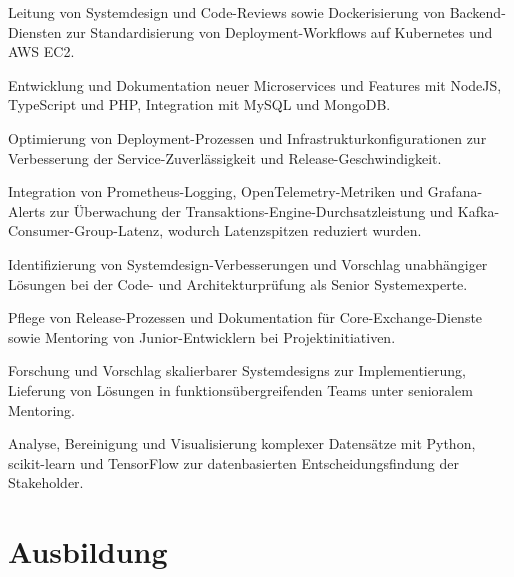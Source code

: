 \documentclass[10pt,a4paper]{resume}
\begin{document}
\bullets
  \item Leitung von Systemdesign und Code-Reviews sowie Dockerisierung von Backend-Diensten zur Standardisierung von Deployment-Workflows auf Kubernetes und AWS EC2.
  \item Entwicklung und Dokumentation neuer Microservices und Features mit NodeJS, TypeScript und PHP, Integration mit MySQL und MongoDB.
  \item Optimierung von Deployment-Prozessen und Infrastrukturkonfigurationen zur Verbesserung der Service-Zuverlässigkeit und Release-Geschwindigkeit.
\bulletsend
\vspace{1.5pt}
\bullets
  \item Integration von Prometheus-Logging, OpenTelemetry-Metriken und Grafana-Alerts zur Überwachung der Transaktions-Engine-Durchsatzleistung und Kafka-Consumer-Group-Latenz, wodurch Latenzspitzen reduziert wurden.
  \item Identifizierung von Systemdesign-Verbesserungen und Vorschlag unabhängiger Lösungen bei der Code- und Architekturprüfung als Senior Systemexperte.
  \item Pflege von Release-Prozessen und Dokumentation für Core-Exchange-Dienste sowie Mentoring von Junior-Entwicklern bei Projektinitiativen.
\bulletsend
\vspace{1.5pt}
\bullets
  \item Forschung und Vorschlag skalierbarer Systemdesigns zur Implementierung, Lieferung von Lösungen in funktionsübergreifenden Teams unter senioralem Mentoring.
  \item Analyse, Bereinigung und Visualisierung komplexer Datensätze mit Python, scikit-learn und TensorFlow zur datenbasierten Entscheidungsfindung der Stakeholder.
\bulletsend
\vspace{1.5pt}

\section{Ausbildung}

\vspace{2pt}
\end{document}
